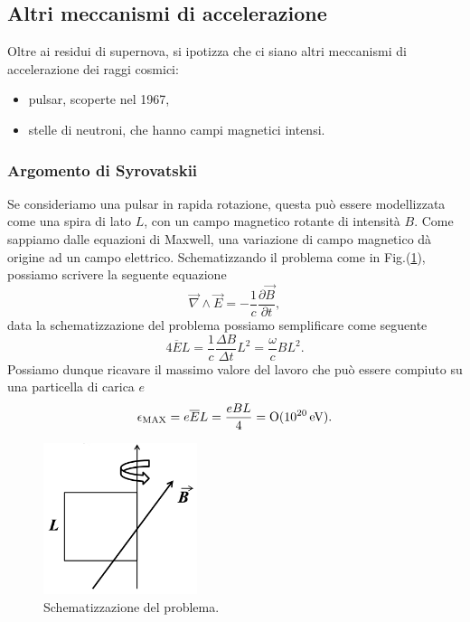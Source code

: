 \subsection{Altri meccanismi di accelerazione}
Oltre ai residui di supernova, si ipotizza che ci siano altri meccanismi di accelerazione dei raggi cosmici:
\begin{itemize}
    \item pulsar, scoperte nel 1967,
    \item stelle di neutroni, che hanno campi magnetici intensi.
\end{itemize}

\subsubsection*{Argomento di Syrovatskii}
Se consideriamo una pulsar in rapida rotazione, questa può essere modellizzata come una spira di lato $L$, con un campo magnetico rotante di intensità $B$. Come sappiamo dalle equazioni di Maxwell, una variazione di campo magnetico dà origine ad un campo elettrico. Schematizzando il problema come in Fig.(\ref{img:syro}), possiamo scrivere la seguente equazione
\begin{equation*}
    \vec{\nabla} \wedge \vec{E} = - \frac{1}{c}\frac{\partial \vec{B}}{\partial t},
\end{equation*}
data la schematizzazione del problema possiamo semplificare come seguente
\begin{equation*}
    4 \overline{E} L = \frac{1}{c} \frac{\Delta B}{\Delta t} L^2 = \frac{\omega}{c} B L^2.
\end{equation*}
Possiamo dunque ricavare il massimo valore del lavoro che può essere compiuto su una particella di carica $e$
\begin{equation*}
    \epsilon_\textup{MAX} = e \overline{E} L = \frac{eBL}{4} = \textup{O}(10^{20}\,\textup{eV}).
\end{equation*}

\begin{figure}[H]
    \centering
    \includegraphics[width=0.4\textwidth]{img/syro.png}
    \caption{Schematizzazione del problema.}
    \label{img:syro}    
\end{figure}

